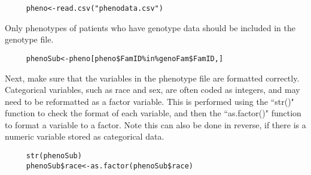 \documentclass{ar2e}
\begin{document}
\begin{samepage}
\begin{verbatim}
     pheno<-read.csv("phenodata.csv")
\end{verbatim}
\end{samepage}

Only phenotypes of patients who have genotype data should be included in the genotype file.

\begin{samepage}
\begin{verbatim}
     phenoSub<-pheno[pheno$FamID%in%genoFam$FamID,]
\end{verbatim}
\end{samepage}

Next, make sure that the variables in the phenotype file are formatted correctly.  Categorical variables, such as race and sex, are often coded as integers, and may need to be reformatted as a factor variable. This is performed using the ``str()" function to check the format of each variable, and then the ``as.factor()" function to format a variable to a factor. Note this can also be done in reverse, if there is a numeric variable stored as categorical data.

\begin{samepage}
\begin{verbatim}
     str(phenoSub)
     phenoSub$race<-as.factor(phenoSub$race)
\end{verbatim}
\end{samepage}
\end{document}
